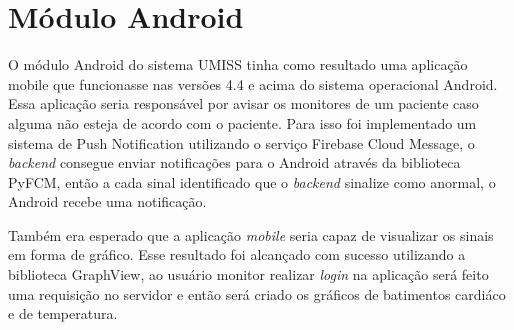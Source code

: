 \section{Módulo Android}

O módulo Android do sistema UMISS tinha como resultado uma aplicação mobile que 
funcionasse nas versões 4.4 e acima do sistema operacional Android. Essa aplicação
seria responsável por avisar os monitores de um paciente caso alguma não esteja de
acordo com o paciente. Para isso foi implementado um sistema de Push Notification
utilizando o serviço Firebase Cloud Message, o \textit{backend} consegue enviar 
notificações para o Android através da biblioteca PyFCM, então a cada sinal identificado
que o \textit{backend} sinalize como anormal, o Android recebe uma notificação.

Também era esperado que a aplicação \textit{mobile} seria capaz de visualizar
os sinais em forma de gráfico. Esse resultado foi alcançado com sucesso utilizando
a biblioteca GraphView, ao usuário monitor realizar \textit{login} na aplicação será
feito uma requisição no servidor e então será criado os gráficos de batimentos cardiáco
e de temperatura.






